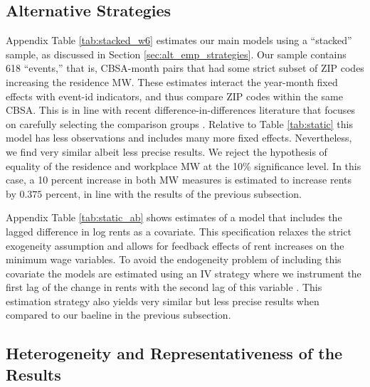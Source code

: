\subsection{Alternative Strategies}
\label{sec:results_alternative_strategies}

Appendix Table \ref{tab:stacked_w6} estimates our main models using a 
``stacked'' sample, as discussed in Section \ref{sec:alt_emp_strategies}.
Our sample contains 618 ``events,'' that is, CBSA-month pairs that had some 
strict subset of ZIP codes increasing the residence MW.
These estimates interact the year-month fixed effects with event-id indicators, 
and thus compare ZIP codes within the same CBSA.
This is in line with recent difference-in-differences literature that 
focuses on carefully selecting the comparison groups 
\parencite{CallawayEtAl2021, deChaisemartinEtAl2022, RothEtAl2022}.
Relative to Table \ref{tab:static} this model has less observations and includes 
many more fixed effects.
Nevertheless, we find very similar albeit less precise results.
We reject the hypothesis of equality of the residence and workplace MW at the
10\% significance level.
In this case, a 10 percent increase in both MW measures is estimated to 
increase rents by $0.375$ percent, in line with the results of the previous 
subsection.

Appendix Table \ref{tab:static_ab} shows estimates of a model that includes
the lagged difference in log rents as a covariate.
This specification relaxes the strict exogeneity assumption and allows for 
feedback effects of rent increases on the minimum wage variables.
To avoid the endogeneity problem of including this covariate the models are 
estimated using an IV strategy where we instrument the first lag of the change 
in rents with the second lag of this variable 
\parencite{ArellanoBond1991,ArellanoHonore2001}.
This estimation strategy also yields very similar but less precise results
when compared to our baeline in the previous subsection.

\subsection{Heterogeneity and Representativeness of the Results}
\label{sec:results_heterogeneity}

